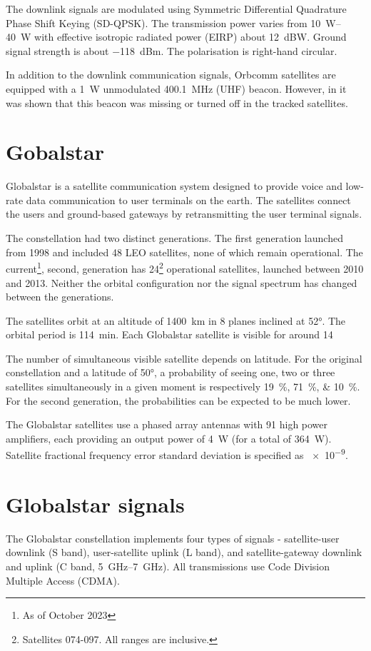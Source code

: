 The downlink signals are modulated using Symmetric Differential Quadrature Phase Shift Keying (SD-QPSK). The transmission power varies from \qtyrange{10}{40}{W} with effective isotropic radiated power (EIRP) about \qty{12}{dBW}. Ground signal strength is about \qty{-118}{dBm}. The polarisation is right-hand circular\cite{sop08, sat11}.

In addition to the downlink communication signals, Orbcomm satellites are equipped with a \qty{1}{W} unmodulated \qty{400.1}{MHz} (UHF) beacon\cite{sat13}. However, in \cite{sop08} it was shown that this beacon was missing or turned off in the tracked satellites.

\section{Gobalstar}
Globalstar is a satellite communication system designed to provide voice and low-rate data communication to user terminals on the earth. The satellites connect the users and ground-based gateways by retransmitting the user terminal signals\cite{sop07, sat14}.

The constellation had two distinct generations. The first generation launched from 1998 and included 48 LEO satellites, none of which remain operational. The current\footnote{As of October 2023}, second, generation has 24\footnote{Satellites 074-097. All ranges are inclusive.} operational satellites, launched between 2010 and 2013. Neither the orbital configuration nor the signal spectrum has changed between the generations\cite{sat15}.


The satellites orbit at an altitude of \qty{1400}{km} in 8 planes inclined at \ang{52}. The orbital period is \qty{114}{min}. Each Globalstar satellite is visible for around \qty{14}{\min}\cite{sat14, sat15}

The number of simultaneous visible satellite depends on latitude. For the original constellation and a latitude of \ang{50}, a probability of seeing one, two or three satellites simultaneously in a given moment is respectively \qtylist{19;71;10}{\percent}\cite{sop07}. For the second generation, the probabilities can be expected to be much lower.

The Globalstar satellites use a phased array antennas with 91 high power amplifiers, each providing an output power of \qty{4}{W} (for a total of \qty{364}{W})\cite{sat14}. Satellite fractional frequency error standard deviation is specified as \num{e-9}\cite{sop07}.


\section{Globalstar signals}
The Globalstar constellation implements four types of signals - satellite-user downlink (S band), user-satellite uplink (L band), and satellite-gateway downlink and uplink (C band, \qtyrange{5}{7}{GHz}). All transmissions use Code Division Multiple Access (CDMA)\cite{sat10}.

